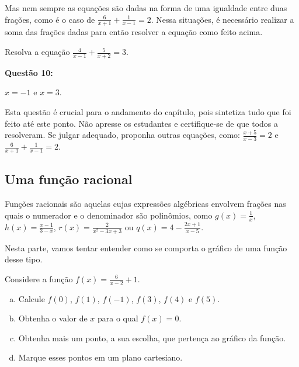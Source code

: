\documentclass[main_estudante.tex]{subfiles}
\begin{document}
Mas nem sempre as equações são dadas na forma de uma igualdade entre duas frações, como é o caso de $\frac{6}{x+1}+\frac{1}{x-1}=2$. Nessa situações, é necessário realizar a soma das frações dadas para então resolver a equação como feito acima.

\begin{questao}
Resolva a equação $\frac{4}{x-1}+\frac{5}{x+2}=3$.
\end{questao}

\noindent\textbf{Questão 10:} 
\begin{gabarito}
	\begin{gabaritoQuestao}
		$x=-1$ e $x=3$.
	\end{gabaritoQuestao}
\end{gabarito}

\paraTutores

Esta questão é crucial para o andamento do capítulo, pois sintetiza tudo que foi feito até este ponto. Não apresse os estudantes e certifique-se de que todos a resolveram. Se julgar adequado, proponha outras equações, como: $\frac{x+5}{x-3}=2$ e $\frac{6}{x+1}+\frac{1}{x-1}=2$.

\paraAmbos

\subsection*{Uma função racional}

Funções racionais são aquelas cujas expressões algébricas envolvem frações nas quais o numerador e o denominador são polinômios, como $g(x)=\frac{1}{x}$, $h(x)=\frac{x-1}{3-x}$, $r(x)=\frac{2}{x^2-3x+3}$ ou $q(x)=4-\frac{2x+1}{x-5}$.

Nesta parte, vamos tentar entender como se comporta o gráfico de uma função desse tipo.

\begin{questao}
Considere a função $f(x)=\frac{6}{x-2}+1$.
\begin{enumerate}[a)]
\item Calcule $f(0)$, $f(1)$, $f(-1)$, $f(3)$, $f(4)$ e $f(5)$.
\item Obtenha o valor de $x$ para o qual $f(x)=0$.
\item Obtenha mais um ponto, a sua escolha, que pertença ao gráfico da função.
\item Marque esses pontos em um plano cartesiano.
\end{enumerate}
\end{questao}
\end{document}
